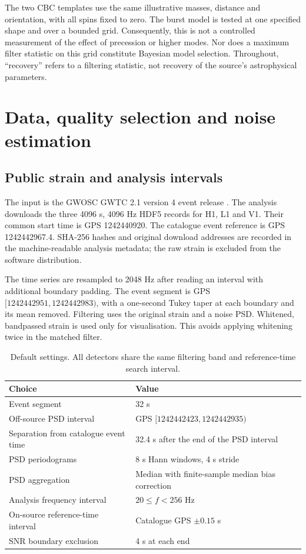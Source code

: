 \documentclass[11pt,a4paper]{article}
\begin{document}
The two CBC templates use the same illustrative masses, distance and orientation, with all spins fixed to zero. The burst model is tested at one specified shape and over a bounded grid. Consequently, this is not a controlled measurement of the effect of precession or higher modes. Nor does a maximum filter statistic on this grid constitute Bayesian model selection. Throughout, ``recovery'' refers to a filtering statistic, not recovery of the source's astrophysical parameters.

\section{Data, quality selection and noise estimation}
\subsection{Public strain and analysis intervals}
The input is the GWOSC GWTC 2.1 version 4 event release \cite{data,opendata}. The analysis downloads the three 4096 s, 4096 Hz HDF5 records for H1, L1 and V1. Their common start time is GPS 1242440920. The catalogue event reference is GPS 1242442967.4. SHA-256 hashes and original download addresses are recorded in the machine-readable analysis metadata; the raw strain is excluded from the software distribution.

The time series are resampled to 2048 Hz after reading an interval with additional boundary padding. The event segment is GPS $[1242442951,1242442983)$, with a one-second Tukey taper at each boundary and its mean removed. Filtering uses the original strain and a noise PSD. Whitened, bandpassed strain is used only for visualisation. This avoids applying whitening twice in the matched filter.

\begin{table}[ht]
\centering\small
\begin{tabular}{ll}
\toprule
Choice & Value \\
\midrule
Event segment & 32 s \\
Off-source PSD interval & GPS $[1242442423,1242442935)$ \\
Separation from catalogue event time & 32.4 s after the end of the PSD interval \\
PSD periodograms & 8 s Hann windows, 4 s stride \\
PSD aggregation & Median with finite-sample median bias correction \\
Analysis frequency interval & $20\leq f<256$ Hz \\
On-source reference-time interval & Catalogue GPS $\pm0.15$ s \\
SNR boundary exclusion & 4 s at each end \\
\bottomrule
\end{tabular}
\caption{Default settings. All detectors share the same filtering band and reference-time search interval.}
\end{table}
\end{document}
